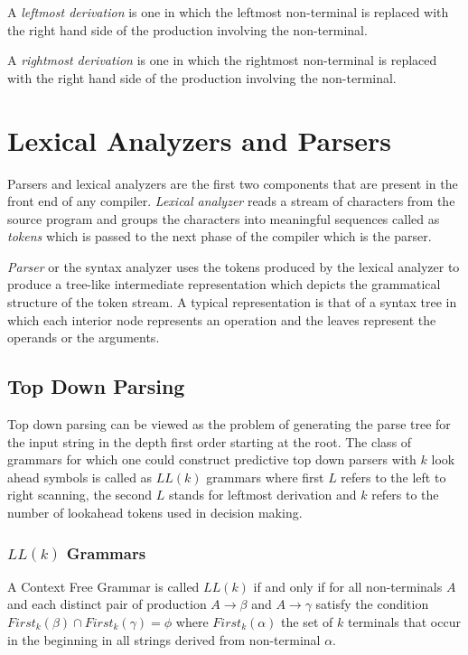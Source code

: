 \documentclass[•]{book}
\begin{document}
A \textit{leftmost derivation} is one in which the leftmost non-terminal is replaced with the right hand side of the production involving the non-terminal.

A \textit{rightmost derivation} is one in which the rightmost non-terminal is replaced with the right hand side of the production involving the non-terminal.

\section{Lexical Analyzers and Parsers}
 Parsers and lexical analyzers are the first two components that are present in the front end of any compiler. \textit{Lexical analyzer} reads a stream of characters from the source program and groups the characters into meaningful sequences called as \textit{tokens} which is passed to the next phase of the compiler which is the parser.  

\textit{Parser} or the syntax analyzer uses the tokens produced by the lexical analyzer to produce a tree-like intermediate representation which depicts the grammatical structure of the token stream. A typical representation is that of a syntax tree in which each interior node represents an operation and the leaves represent the operands or the arguments.

\subsection{Top Down Parsing}
 Top down parsing can be viewed as the problem of generating the parse tree for the input string in the depth first order starting at the root. The class of grammars for which one could construct predictive top down parsers with $k$ look ahead symbols is called as $LL(k)$ grammars where first $L$ refers to the left to right scanning, the second $L$ stands for leftmost derivation and $k$ refers to the number of lookahead tokens used in decision making.
 
 \subsubsection*{$LL(k)$ Grammars}
 A Context Free Grammar is called $LL(k)$ if and only if for all non-terminals $A$ and each distinct pair of production $A \rightarrow \beta$ and $A \rightarrow \gamma$ satisfy the condition $First_k(\beta) \cap First_k(\gamma) = \phi$ where $First_k(\alpha)$ the set of $k$ terminals that occur in the beginning in all strings derived from non-terminal $\alpha$.
 
\end{document}
